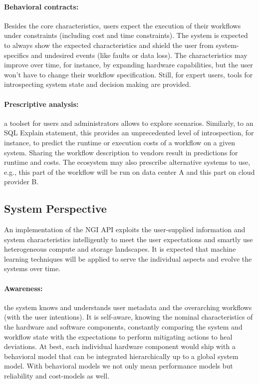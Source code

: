 \documentclass[a4paper, twocolumn]{article}
\begin{document}
\paragraph{Behavioral contracts:}
Besides the core characteristics, users expect the execution of their workflows under constraints (including cost and time constraints).
The system is expected to always show the expected characteristics and shield the user from system-specifics and undesired events (like faults or data loss).
The characteristics may improve over time, for instance, by expanding hardware capabilities, but the user won't have to change their workflow specification.
Still, for expert users, tools for introspecting system state and decision making are  provided.

\paragraph{Prescriptive analysis:} a toolset for users and administrators allows to explore scenarios.
Similarly, to an SQL Explain statement, this provides an unprecedented level of introspection, for instance, to predict the runtime or execution costs of a workflow on a given system.
Sharing the workflow description to vendors result in predictions for runtime and costs.
The ecosystem may also prescribe alternative systems to use, e.g., this part of the workflow will be run on data center A and this part on cloud provider B.



\subsection{System Perspective}

An implementation of the NGI API exploits the user-supplied information and system characteristics intelligently to meet the user expectations and smartly use heterogeneous compute and storage landscapes.
It is expected that machine learning techniques will be applied to serve the individual aspects and evolve the systems over time.

\paragraph{Awareness:}
the system knows and understands user metadata and the overarching workflows (with the user intentions).
It is self-aware, knowing the nominal characteristics of the hardware and software components, constantly comparing the system and workflow state with the expectations to perform mitigating actions to heal deviations.
At best, each individual hardware component would ship with a behavioral model that can be integrated hierarchically up to a global system model.
With behavioral models we not only mean performance models but reliability and cost-models as well.
\end{document}
